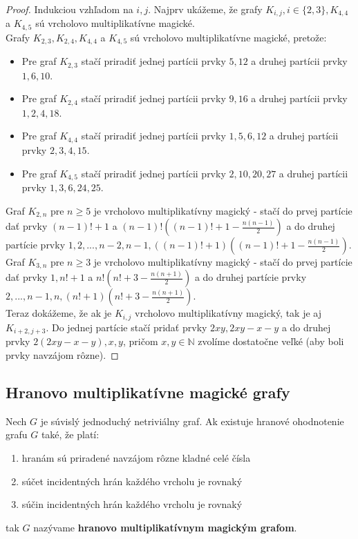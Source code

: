 \begin{proof} Indukciou vzhľadom na $i,j$. Najprv ukážeme, že grafy $K_{i,j}, i \in \{2,3\}, K_{4,4}$ a $K_{4,5}$ sú vrcholovo multiplikatívne magické. \\

Grafy $K_{2,3}, K_{2,4}, K_{4,4}$ a $K_{4,5}$ sú vrcholovo multiplikatívne magické, pretože:
\begin{itemize}
\item Pre graf $K_{2,3}$ stačí priradiť jednej partícii prvky $5, 12$ a druhej partícii prvky $1, 6, 10$.
\item Pre graf $K_{2,4}$ stačí priradiť jednej partícii prvky $9, 16$ a druhej partícii prvky $1, 2, 4, 18$.
\item Pre graf $K_{4,4}$ stačí priradiť jednej partícii prvky $1, 5, 6, 12$ a druhej partícii prvky $2, 3, 4, 15$.
\item Pre graf $K_{4,5}$ stačí priradiť jednej partícii prvky $2, 10, 20, 27$ a druhej partícii prvky $1, 3, 6, 24, 25$.
\end{itemize}

Graf $K_{2,n}$ pre $n \geq 5$ je vrcholovo multiplikatívny magický - stačí do prvej partície dať prvky $(n-1)! + 1$ a $(n-1)! ((n-1)! + 1 - \frac{n(n-1)}{2})$ a do druhej partície prvky $1, 2, ... , n-2, n-1, ((n-1)! + 1) ((n-1)! + 1 - \frac{n(n-1)}{2})$. \\

Graf $K_{3,n}$ pre $n \geq 3$ je vrcholovo multiplikatívny magický - stačí do prvej partície dať prvky $1, n! + 1$ a $n! (n! + 3 - \frac{n(n+1)}{2})$ a do druhej partície prvky $2, ... , n-1, n, (n! + 1) (n! + 3 - \frac{n(n+1)}{2})$. \\

Teraz dokážeme, že ak je $K_{i,j}$ vrcholovo multiplikatívny magický, tak je aj $K_{i+2,j+3}$. Do jednej partície stačí pridať prvky $2xy, 2xy - x - y$ a do druhej prvky $2(2xy - x - y), x, y$, pričom $x,y \in \mathbb{N}$ zvolíme dostatočne veľké (aby boli prvky navzájom rôzne).
\end{proof}



\subsection{Hranovo multiplikatívne magické grafy}

\begin{subdefinition} Nech $G$ je súvislý jednoduchý netriviálny graf. Ak existuje hranové ohodnotenie grafu $G$ také, že platí:

\begin{enumerate}
\item hranám sú priradené navzájom rôzne kladné celé čísla
\item súčet incidentných hrán každého vrcholu je rovnaký
\item súčin incidentných hrán každého vrcholu je rovnaký
\end{enumerate}

tak $G$ nazývame \textbf{hranovo multiplikatívnym magickým grafom}.
\end{subdefinition} 

